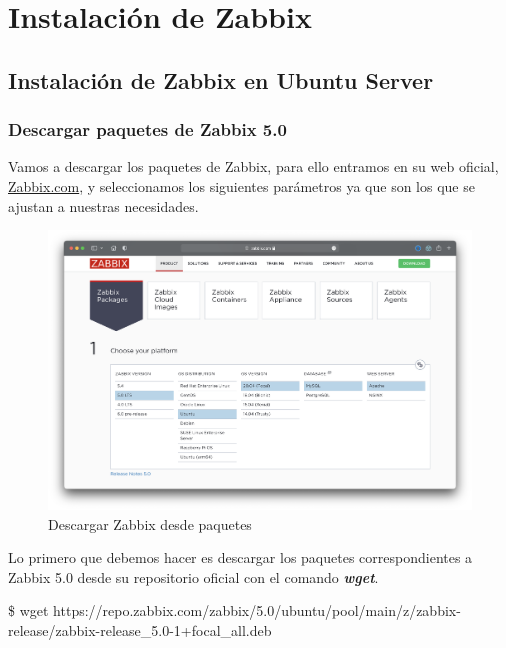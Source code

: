 \newpage %

\tableofcontents %
\listoffigures %

\newpage
\section{Instalación de Zabbix}
\subsection{Instalación de Zabbix en Ubuntu Server}
\subsubsection{Descargar paquetes de Zabbix 5.0}

    Vamos a descargar los paquetes de Zabbix, para ello entramos en su web oficial, \href{https://www.zabbix.com/download}{Zabbix.com}, y 
    seleccionamos los siguientes parámetros ya que son los que se ajustan a nuestras necesidades.
        
    \begin{figure}[H]
        \centering
        \includegraphics[scale=0.3]{images/zabbix_official.png}
        \caption{Descargar Zabbix desde paquetes}
        \label{fig:zabbix_official}
    \end{figure}

    Lo primero que debemos hacer es descargar los paquetes correspondientes a Zabbix 5.0 desde su repositorio oficial con el comando \textbf{\emph{wget}}. 
        \begin{tcolorbox}[colback=black!10, halign=left]
            \$ wget https://repo.zabbix.com/zabbix/5.0/ubuntu/pool/main/z/zabbix-release/zabbix-release\_5.0-1+focal\_all.deb
        \end{tcolorbox}

